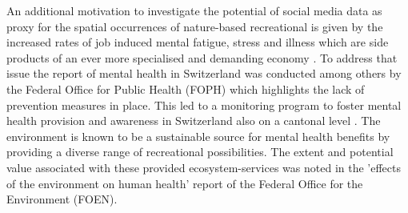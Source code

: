 An additional motivation to investigate the potential of social media data as proxy for the spatial occurrences of nature-based recreational is given by the increased rates of job induced mental fatigue, stress and illness which are side products of an ever more specialised and demanding economy \parencite{Trenberth2002}. To address that issue the report of mental health in Switzerland \parencite{Ruesch2003} was conducted among others by the Federal Office for Public Health (FOPH) which highlights the lack of prevention measures in place. This led to a monitoring program to foster mental health provision and awareness in Switzerland also on a cantonal level \parencite{Schuler2012}. The environment is known to be a sustainable source for mental health benefits by providing a diverse range of recreational possibilities. The extent and potential value associated with these provided ecosystem-services was noted in the 'effects of the environment on human health' report \parencite{Ragettli2017} of the Federal Office for the Environment (FOEN).



